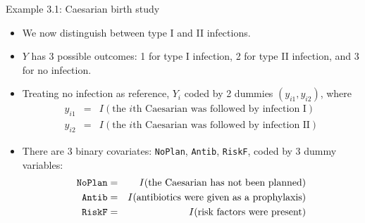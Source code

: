 \documentclass{beamer}
\begin{document}
\begin{frame}{Example 3.1: Caesarian birth study}
\begin{itemize}
\item We now distinguish between type I and II infections. 
\item
$Y$ has 3 possible outcomes: 1 for type I infection, 2 for type II infection,
and 3 for no infection.
\item
Treating no infection as reference, $Y_i$ coded by 2 dummies $(y_{i1},y_{i2})$, where 
\begin{eqnarray*}
y_{i1}&=& I(\mbox{the $i$th Caesarian was followed by infection I}) \\
y_{i2} &=& I(\mbox{the $i$th Caesarian was followed by infection II})
\end{eqnarray*}
\item
There are 3 binary covariates: \texttt{NoPlan}, \texttt{Antib}, \texttt{RiskF}, coded by 3 dummy variables:
\begin{eqnarray*}
\mbox{\texttt{NoPlan}} &=& I(\mbox{the Caesarian has not been planned}) \\
\mbox{\texttt{Antib}}  &=& I(\mbox{antibiotics were given as a prophylaxis}) \\
\mbox{\texttt{RiskF}}  &=& I(\mbox{risk factors were present}) 
\end{eqnarray*}
\end{itemize}
\end{frame}
\end{document}
